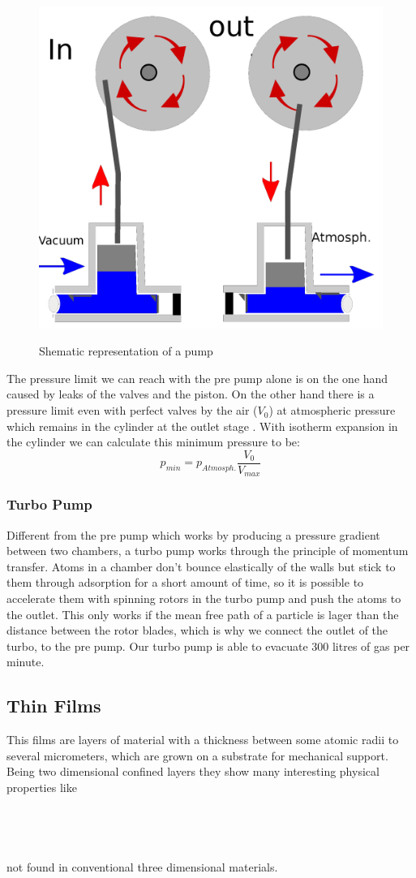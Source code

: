 \documentclass[]{article}
\begin{document}
\begin{figure}
	
	\centering
	\includegraphics[width=0.7\linewidth]{Bilder/PrePump}
	\label{fig:prepump}
	\caption{Shematic representation of a pump}
	
\end{figure}


The pressure limit we can reach with the pre pump alone is on the one hand caused by leaks of the valves and the piston. On the other hand there is a pressure limit even with perfect valves by the air ($V_{0} $) at atmospheric pressure which remains in the cylinder at the outlet stage . With isotherm expansion in the cylinder we can calculate this minimum pressure to be: \[ p_{min}=p_{Atmosph.}\frac{V_{0}}{V_{max}} \]
\subsubsection{Turbo Pump}
Different from the pre pump which works by producing a pressure gradient between two chambers, a turbo pump works through the principle of momentum transfer. Atoms in a chamber don't bounce elastically of the walls but stick to them through adsorption for a short amount of time, so it is possible to accelerate them with spinning rotors in the turbo pump and push the atoms to the outlet. This only works if the mean free path of a particle is lager than the distance between the rotor blades, which is why we connect the outlet of the turbo, to the pre pump. Our turbo pump is able to evacuate 300 litres of gas per minute.
\subsection{Thin Films}
This films are layers of material with a thickness between some atomic radii to several micrometers, which are grown on a substrate for mechanical support. Being two dimensional confined layers they show many interesting physical properties like \\\\\\\\\\ not found in conventional three dimensional materials.
\end{document}
